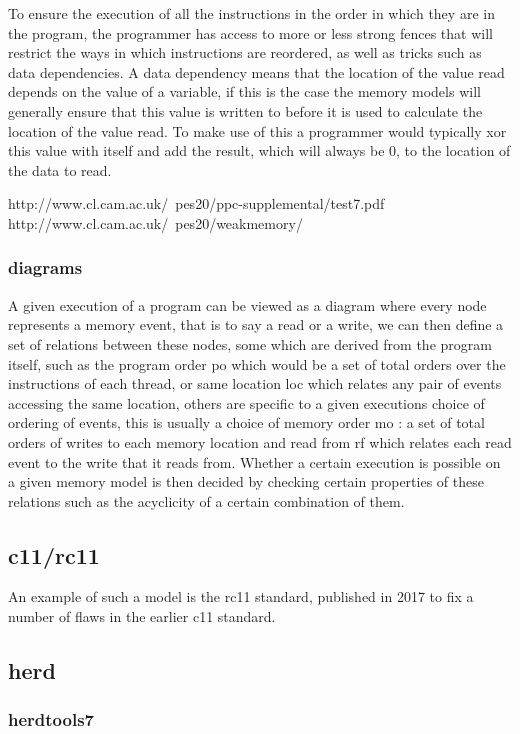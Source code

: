 \documentclass[a4]{article}
\begin{document}
To ensure the execution of all the instructions in the order in which they are in the program, the programmer has access to more or less strong fences that will restrict the ways in which instructions are reordered, as well as tricks such as data dependencies. A data dependency means that the location of the value read depends on the value of a variable, if this is the case the memory models will generally ensure that this value is written to before it is used to calculate the location of the value read. To make use of this a programmer would typically xor this value with itself and add the result, which will always be 0, to the location of the data to read.

http://www.cl.cam.ac.uk/~pes20/ppc-supplemental/test7.pdf
http://www.cl.cam.ac.uk/~pes20/weakmemory/

\subsubsection{diagrams}

A given execution of a program can be viewed as a diagram where every node represents a memory event, that is to say a read or a write, we can then define a set of relations between these nodes, some which are derived from the program itself, such as the program order po which would be a set of total orders over the instructions of each thread, or same location loc which relates any pair of events accessing the same location, others are specific to a given executions choice of ordering of events, this is usually a choice of memory order mo : a set of total orders of writes to each memory location and read from rf which relates each read event to the write that it reads from. Whether a certain execution is possible on a given memory model is then decided by checking certain properties of these relations such as the acyclicity of a certain combination of them.

\subsection{c11/rc11}

An example of such a model is the rc11 standard, published in 2017 to fix a number of flaws in the earlier c11 standard.

\subsection{herd}

\subsubsection{herdtools7}
\end{document}

